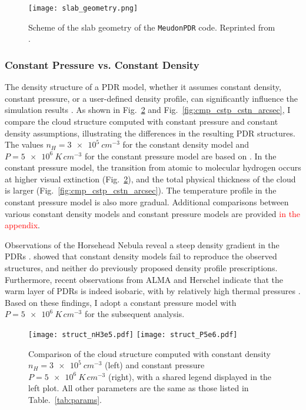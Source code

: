 \documentclass[12pt,a4paper]{article}
\newcommand{\mdpdr}{\texttt{MeudonPDR} code}
\newcommand{\qt}[1]{\textcolor{red}{#1}}
\begin{document}
\begin{figure}
    \centering
    \texttt{[image: slab\_geometry.png]}
    \caption{Scheme of the slab geometry of the \mdpdr{}. Reprinted from \textcite{LePetit2006}.} \label{fig:1Dgeometry}
\end{figure}

\subsubsection{Constant Pressure vs. Constant Density} \label{sec:cstnp}

The density structure of a PDR model, whether it assumes constant density, constant pressure, or a user-defined density profile, can significantly influence the simulation results \parencite{Wolfire2022}. As shown in Fig.~\ref{fig:cmp_cstp_cstn} and Fig.~\ref{fig:cmp_cstp_cstn_arcsec}, I compare the cloud structure computed with constant pressure and constant density assumptions, illustrating the differences in the resulting PDR structures. The values $n_H = \qty{3e5}{cm^{-3}}$ for the constant density model and $P = \qty{5e6}{K\,cm^{-3}}$ for the constant pressure model are based on \textcite{Maillard2023}. In the constant pressure model, the transition from atomic to molecular hydrogen occurs at higher visual extinction (Fig.~\ref{fig:cmp_cstp_cstn}), and the total physical thickness of the cloud is larger (Fig.~\ref{fig:cmp_cstp_cstn_arcsec}). The temperature profile in the constant pressure model is also more gradual. Additional comparisons between various constant density models and constant pressure models are provided \qt{in the appendix}.

Observations of the Horsehead Nebula reveal a steep density gradient in the PDRs \parencite{Habart2005,Guzmán2011}. \textcite{HernándezVera2023} showed that constant density models fail to reproduce the observed structures, and neither do previously proposed density profile prescriptions. Furthermore, recent observations from ALMA and Herschel indicate that the warm layer of PDRs is indeed isobaric, with by relatively high thermal pressures \parencite{Marconi1998,Goicoechea2016,Joblin2018,Wu2018,Bron2018,Maillard2021}. Based on these findings, I adopt a constant pressure model with $P = \qty{5e6}{K\,cm^{-3}}$ for the subsequent analysis.

\begin{figure}[ht]
    \centering
    \texttt{[image: struct\_nH3e5.pdf]}
    \texttt{[image: struct\_P5e6.pdf]}
    \caption{Comparison of the cloud structure computed with constant density $n_H = \qty{3e5}{cm^{-3}}$ (left) and constant pressure $P = \qty{5e6}{K\,cm^{-3}}$ (right), with a shared legend displayed in the left plot. All other parameters are the same as those listed in Table.~\ref{tab:params}.} \label{fig:cmp_cstp_cstn}
\end{figure}
\end{document}
